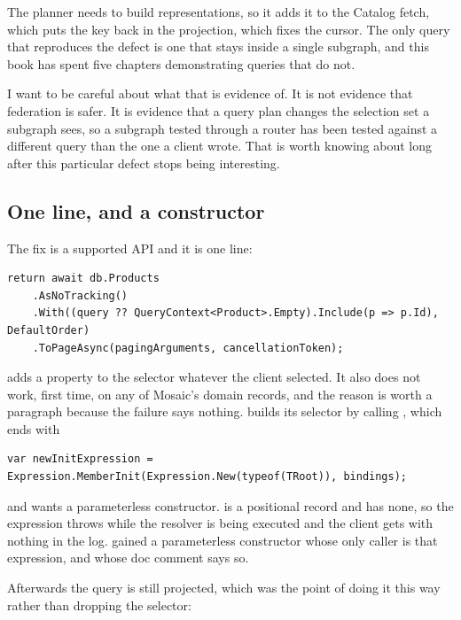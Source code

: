 %
The planner needs  to build representations, so it adds it to
the Catalog fetch, which puts the key back in the projection, which fixes the
cursor. The only query that reproduces the defect is one that stays inside a
single subgraph, and this book has spent five chapters demonstrating queries
that do not.

I want to be careful about what that is evidence of. It is not evidence that
federation is safer. It is evidence that a query plan changes the selection set
a subgraph sees, so a subgraph tested through a router has been tested against a
different query than the one a client wrote. That is worth knowing about long
after this particular defect stops being interesting.

\subsection*{One line, and a constructor}

The fix is a supported API and it is one line:

\begin{verbatim}
return await db.Products
    .AsNoTracking()
    .With((query ?? QueryContext<Product>.Empty).Include(p => p.Id), DefaultOrder)
    .ToPageAsync(pagingArguments, cancellationToken);
\end{verbatim}

 adds a property to the selector whatever the client
selected. It also does not work, first time, on any of Mosaic's domain records,
and the reason is worth a paragraph because the failure says nothing.
 builds its selector by calling ,
which ends with

\begin{verbatim}
var newInitExpression = Expression.MemberInit(Expression.New(typeof(TRoot)), bindings);
\end{verbatim}

and  wants a parameterless constructor.
 is a positional record and has none, so the expression throws
while the resolver is being executed and the client gets
 with nothing in the log.  gained
a parameterless constructor whose only caller is that expression, and whose
doc comment says so.

%
Afterwards the query is still projected, which was the point of doing it this
way rather than dropping the selector:

